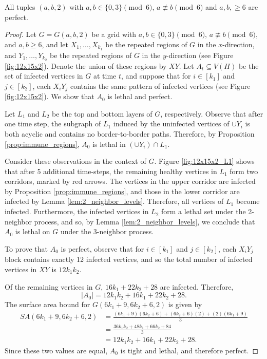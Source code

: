 \begin{con}
\label{con:2x3x0_mod6}
All tuples $(a,b,2)$ with $a,b \in \{0,3\} \pmod 6$, $a \not\equiv b \pmod 6$ and $a,b, \geq 6$ are perfect. 
\end{con}

\begin{proof}
Let $G=G(a,b,2)$ be a grid with $a,b \in \{0,3\} \pmod 6$, $a \not\equiv b \pmod 6$, and $a,b \geq 6$, and let $X_1, \dots, X_{k_1}$ be the repeated regions of $G$ in the $x$-direction, and $Y_1, \dots, Y_{k_2}$ be the repeated regions of $G$ in the $y$-direction (see Figure \ref{fig:12x15x2}). Denote the union of these regions by $XY$. Let $A_t \subseteq V(H)$ be the set of infected vertices in $G$ at time $t$, and suppose that for $i \in [k_1]$ and $j \in [k_2]$, each $X_iY_j$ contains the same pattern of infected vertices (see Figure \ref{fig:12x15x2}). We show that $A_0$ is lethal and perfect.

Let $L_1$ and $L_2$ be the top and bottom layers of $G$, respectively. Observe that after one time step, the subgraph of $L_1$ induced by the uninfected vertices of $\cup Y_i$ is both acyclic and contains no border-to-border paths. Therefore, by Proposition \ref{prop:immune_regions}, $A_0$ is lethal in $(\cup Y_i) \cap L_1$. 

Consider these observations in the context of $G$. Figure \ref{fig:12x15x2_L1} shows that after 5 additional time-steps, the remaining healthy vertices in $L_1$ form two corridors, marked by red arrows. The vertices in the upper corridor are infected by Proposition \ref{prop:immune_regions}, and those in the lower corridor are infected by Lemma \ref{lem:2_neighbor_levels}. Therefore, all vertices of $L_1$ become infected. Furthermore, the infected vertices in $L_2$ form a lethal set under the 2-neighbor process, and so, by Lemma \ref{lem:2_neighbor_levels}, we conclude that $A_0$ is lethal on $G$ under the 3-neighbor process.

To prove that $A_0$ is perfect, observe that for $i \in [k_1]$ and $j \in [k_2]$, each $X_iY_j$ block contains exactly 12 infected vertices, and so the total number of infected vertices in $XY$ is $12k_1k_2$. 

Of the remaining vertices in $G$, $16k_1+22k_2+28$ are infected. Therefore,
$$|A_0| = 12k_1k_2 + 16k_1+22k_2+28.$$ 
The surface area bound for $G(6k_1+9,6k_2+6,2)$ is given by
\begin{align*}
SA(6k_1+9,6k_2+6,2) &= \frac{(6k_1+9)(6k_2+6) + (6k_2+6)(2) + (2)(6k_1+9)}{3} \\
&= \frac{36k_1k_2+ 48k_1 + 66k_2 + 84}{3} \\
&= 12k_1k_2+16k_1+22k_2+28.
\end{align*}
Since these two values are equal, $A_0$ is tight and lethal, and therefore perfect.
\end{proof}

